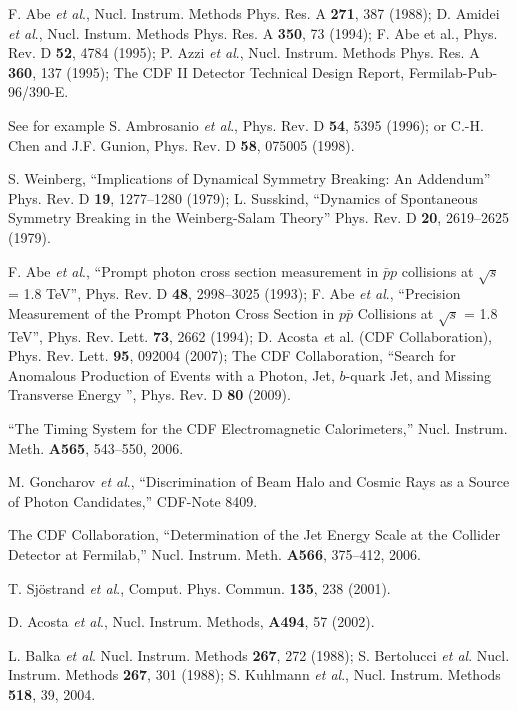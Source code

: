 \documentclass[12pt,twoside,letterpaper,doublespace]{article}
\begin{document}
\begin{thebibliography}{99}
F. Abe \textit{et al}., Nucl. Instrum. Methods Phys. Res. A {\bf 271}, 387 (1988);
D. Amidei \textit{et al}., Nucl. Instum. Methods Phys. Res. A {\bf 350}, 73 (1994);
F. Abe et al., Phys. Rev. D {\bf 52}, 4784 (1995);
P. Azzi \textit{et al}., Nucl. Instrum. Methods Phys. Res. A {\bf
360}, 137 (1995);
The CDF II Detector Technical Design Report, Fermilab-Pub-96/390-E.

See for example S. Ambrosanio \textit{et al}., Phys. Rev. D \textbf{54}, 5395 (1996); or C.-H. Chen and J.F. Gunion, Phys. Rev. D \textbf{58}, 075005 (1998).

  S. Weinberg, ``Implications of Dynamical Symmetry Breaking: An Addendum'' Phys. Rev. D {\bf 19}, 1277--1280 (1979);
  L. Susskind, ``Dynamics of Spontaneous Symmetry Breaking in the Weinberg-Salam Theory'' Phys. Rev. D {\bf 20}, 2619--2625 (1979).

 F. Abe \textit{et al}., ``Prompt photon cross section measurement in $\bar{p}p$ collisions at $\sqrt{s}$ = 1.8 TeV'', Phys. Rev. D {\bf 48}, 2998--3025 (1993);
 F. Abe \textit{et al}., ``Precision Measurement of the Prompt Photon Cross Section in $p\bar{p}$ Collisions at $\sqrt{s}$ = 1.8 TeV'', Phys. Rev. Lett. {\bf 73}, 2662 (1994);
 D. Acosta {\textit et al.} (CDF Collaboration), Phys. Rev. Lett. {\bf 95}, 092004 (2007);  The CDF Collaboration, ``Search for Anomalous Production of Events with a Photon, Jet, $b$-quark Jet, and Missing Transverse Energy '', Phys. Rev. D {\bf 80} (2009).

``The Timing System for the CDF Electromagnetic Calorimeters,'' Nucl. Instrum. Meth. {\bf A565}, 543--550, 2006.

 M. Goncharov \textit{et al}., ``Discrimination of Beam Halo and Cosmic Rays as a Source of Photon Candidates,'' CDF-Note 8409.

 The CDF Collaboration, ``Determination of the Jet Energy Scale at the Collider Detector at Fermilab,'' Nucl. Instrum. Meth. \textbf{A566}, 375--412, 2006.

T. Sj\"{o}strand \textit{et al}., Comput. Phys. Commun. \textbf{135}, 238 (2001).


 D. Acosta \textit{et al}., Nucl. Instrum. Methods, \textbf{A494}, 57 (2002).

  L. Balka \textit{et al}. Nucl. Instrum. Methods \textbf{267}, 272 (1988); S. Bertolucci \textit{et al}. Nucl. Instrum. Methods \textbf{267}, 301 (1988); S. Kuhlmann \textit{et al}., Nucl. Instrum. Methods \textbf{518}, 39, 2004.


\end{thebibliography}
\end{document}
